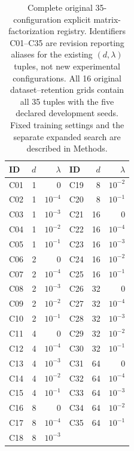 \begin{table}[H]
\centering
\caption{Complete original 35-configuration explicit matrix-factorization registry. Identifiers C01--C35 are revision reporting aliases for the existing $(d,\lambda)$ tuples, not new experimental configurations. All 16 original dataset--retention grids contain all 35 tuples with the five declared development seeds. Fixed training settings and the separate expanded search are described in Methods.}
\label{tab:config-registry}
\small
\begin{tabular}{@{}lrrlrr@{}}
\toprule
ID & $d$ & $\lambda$ & ID & $d$ & $\lambda$ \\
\midrule
C01 & 1 & $0$ & C19 & 8 & $10^{-2}$ \\
C02 & 1 & $10^{-4}$ & C20 & 8 & $10^{-1}$ \\
C03 & 1 & $10^{-3}$ & C21 & 16 & $0$ \\
C04 & 1 & $10^{-2}$ & C22 & 16 & $10^{-4}$ \\
C05 & 1 & $10^{-1}$ & C23 & 16 & $10^{-3}$ \\
C06 & 2 & $0$ & C24 & 16 & $10^{-2}$ \\
C07 & 2 & $10^{-4}$ & C25 & 16 & $10^{-1}$ \\
C08 & 2 & $10^{-3}$ & C26 & 32 & $0$ \\
C09 & 2 & $10^{-2}$ & C27 & 32 & $10^{-4}$ \\
C10 & 2 & $10^{-1}$ & C28 & 32 & $10^{-3}$ \\
C11 & 4 & $0$ & C29 & 32 & $10^{-2}$ \\
C12 & 4 & $10^{-4}$ & C30 & 32 & $10^{-1}$ \\
C13 & 4 & $10^{-3}$ & C31 & 64 & $0$ \\
C14 & 4 & $10^{-2}$ & C32 & 64 & $10^{-4}$ \\
C15 & 4 & $10^{-1}$ & C33 & 64 & $10^{-3}$ \\
C16 & 8 & $0$ & C34 & 64 & $10^{-2}$ \\
C17 & 8 & $10^{-4}$ & C35 & 64 & $10^{-1}$ \\
C18 & 8 & $10^{-3}$ &  &  &  \\
\bottomrule
\end{tabular}%
\end{table}
